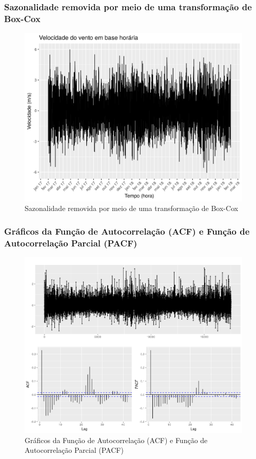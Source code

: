 \documentclass{beamer}
\begin{document}
\begin{frame}
	\frametitle{Sazonalidade removida por meio de uma transformação de Box-Cox}
	\begin{figure}
		\centering
		\includegraphics[width=\textwidth]{entire_series_hourly_basis_seasonless_boxcox.png}
		\caption{Sazonalidade removida por meio de uma transformação de Box-Cox}
	\end{figure}
\end{frame}

\begin{frame}
	\frametitle{Gráficos da Função de Autocorrelação (ACF) e Função de Autocorrelação Parcial (PACF)}
	\begin{figure}
		\centering
		\includegraphics[width=\textwidth]{long_memory.png}
		\caption{Gráficos da Função de Autocorrelação (ACF) e Função de Autocorrelação Parcial (PACF)}
	\end{figure}
\end{frame}
\end{document}
